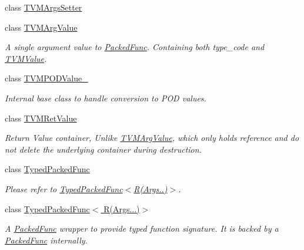 \begin{DoxyCompactItemize}
class \hyperlink{classtvm_1_1runtime_1_1TVMArgsSetter}{T\+V\+M\+Args\+Setter}
\item 
class \hyperlink{classtvm_1_1runtime_1_1TVMArgValue}{T\+V\+M\+Arg\+Value}
\begin{DoxyCompactList}\small\item\em A single argument value to \hyperlink{classtvm_1_1runtime_1_1PackedFunc}{Packed\+Func}. Containing both type\+\_\+code and \hyperlink{unionTVMValue}{T\+V\+M\+Value}. \end{DoxyCompactList}\item 
class \hyperlink{classtvm_1_1runtime_1_1TVMPODValue__}{T\+V\+M\+P\+O\+D\+Value\+\_\+}
\begin{DoxyCompactList}\small\item\em Internal base class to handle conversion to P\+OD values. \end{DoxyCompactList}\item 
class \hyperlink{classtvm_1_1runtime_1_1TVMRetValue}{T\+V\+M\+Ret\+Value}
\begin{DoxyCompactList}\small\item\em Return Value container, Unlike \hyperlink{classtvm_1_1runtime_1_1TVMArgValue}{T\+V\+M\+Arg\+Value}, which only holds reference and do not delete the underlying container during destruction. \end{DoxyCompactList}\item 
class \hyperlink{classtvm_1_1runtime_1_1TypedPackedFunc}{Typed\+Packed\+Func}
\begin{DoxyCompactList}\small\item\em Please refer to \hyperlink{classtvm_1_1runtime_1_1TypedPackedFunc_3_01R_07Args_8_8_8_08_4_TypedPackedFuncAnchor}{Typed\+Packed\+Func$<$R(Args..)$>$}. \end{DoxyCompactList}\item 
class \hyperlink{classtvm_1_1runtime_1_1TypedPackedFunc_3_01R_07Args_8_8_8_08_4}{Typed\+Packed\+Func$<$ R(\+Args...)$>$}
\begin{DoxyCompactList}\small\item\em A \hyperlink{classtvm_1_1runtime_1_1PackedFunc}{Packed\+Func} wrapper to provide typed function signature. It is backed by a \hyperlink{classtvm_1_1runtime_1_1PackedFunc}{Packed\+Func} internally. \end{DoxyCompactList}\end{DoxyCompactItemize}

